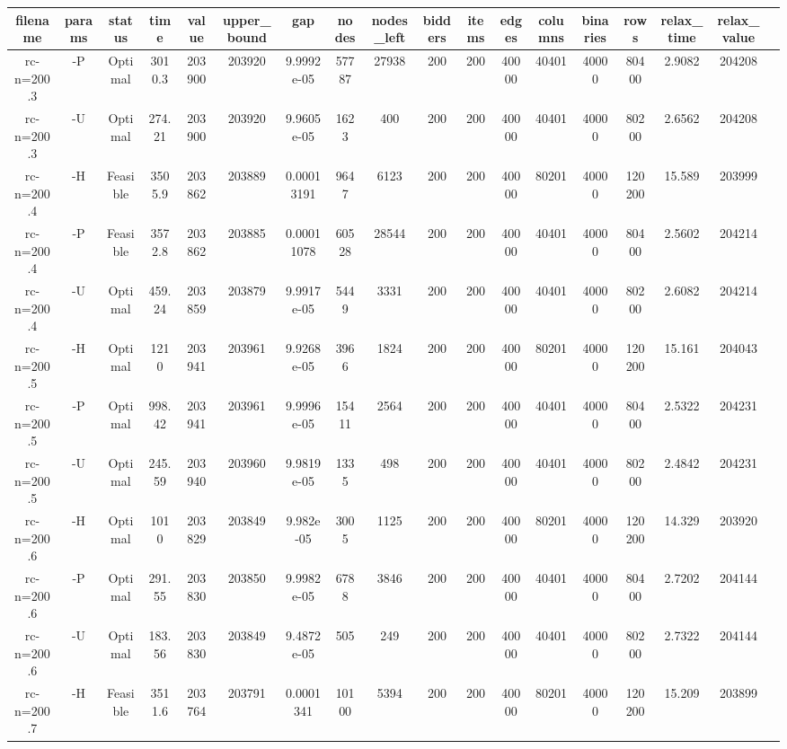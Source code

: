 \documentclass[landscape, a4paper]{article}
\begin{document}
\begin{center}
\begin{tabular}{@{}cccccccccccccccccc@{}}
filename & params & status & time & value & upper\_bound & gap & nodes & nodes\_left & bidders & items & edges & columns & binaries & rows & relax\_time & relax\_value & \\
\hline
rc-n=200.3 & -P & Optimal & 3010.3 & 203900 & 203920 & 9.9992e-05 & 57787 & 27938 & 200 & 200 & 40000 & 40401 & 40000 & 80400 & 2.9082 & 204208 & \\
rc-n=200.3 & -U & Optimal & 274.21 & 203900 & 203920 & 9.9605e-05 & 1623 & 400 & 200 & 200 & 40000 & 40401 & 40000 & 80200 & 2.6562 & 204208 & \\
rc-n=200.4 & -H & Feasible & 3505.9 & 203862 & 203889 & 0.00013191 & 9647 & 6123 & 200 & 200 & 40000 & 80201 & 40000 & 120200 & 15.589 & 203999 & \\
rc-n=200.4 & -P & Feasible & 3572.8 & 203862 & 203885 & 0.00011078 & 60528 & 28544 & 200 & 200 & 40000 & 40401 & 40000 & 80400 & 2.5602 & 204214 & \\
rc-n=200.4 & -U & Optimal & 459.24 & 203859 & 203879 & 9.9917e-05 & 5449 & 3331 & 200 & 200 & 40000 & 40401 & 40000 & 80200 & 2.6082 & 204214 & \\
rc-n=200.5 & -H & Optimal & 1210 & 203941 & 203961 & 9.9268e-05 & 3966 & 1824 & 200 & 200 & 40000 & 80201 & 40000 & 120200 & 15.161 & 204043 & \\
rc-n=200.5 & -P & Optimal & 998.42 & 203941 & 203961 & 9.9996e-05 & 15411 & 2564 & 200 & 200 & 40000 & 40401 & 40000 & 80400 & 2.5322 & 204231 & \\
rc-n=200.5 & -U & Optimal & 245.59 & 203940 & 203960 & 9.9819e-05 & 1335 & 498 & 200 & 200 & 40000 & 40401 & 40000 & 80200 & 2.4842 & 204231 & \\
rc-n=200.6 & -H & Optimal & 1010 & 203829 & 203849 & 9.982e-05 & 3005 & 1125 & 200 & 200 & 40000 & 80201 & 40000 & 120200 & 14.329 & 203920 & \\
rc-n=200.6 & -P & Optimal & 291.55 & 203830 & 203850 & 9.9982e-05 & 6788 & 3846 & 200 & 200 & 40000 & 40401 & 40000 & 80400 & 2.7202 & 204144 & \\
rc-n=200.6 & -U & Optimal & 183.56 & 203830 & 203849 & 9.4872e-05 & 505 & 249 & 200 & 200 & 40000 & 40401 & 40000 & 80200 & 2.7322 & 204144 & \\
rc-n=200.7 & -H & Feasible & 3511.6 & 203764 & 203791 & 0.0001341 & 10100 & 5394 & 200 & 200 & 40000 & 80201 & 40000 & 120200 & 15.209 & 203899 & \\

\end{tabular}
\end{center}
\end{document}
